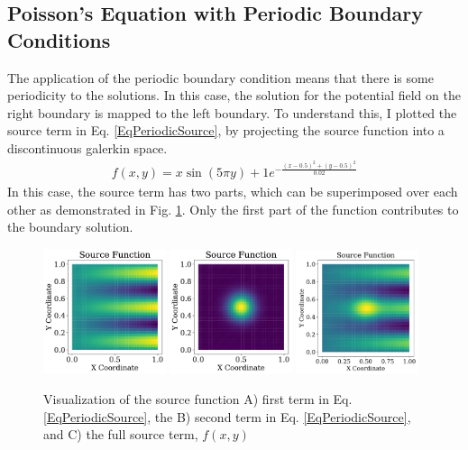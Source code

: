 \documentclass[12pt,3p]{article}
\begin{document}
\subsection{Poisson's Equation with Periodic Boundary Conditions}
\vspace{-1ex}
The application of the periodic boundary condition means that there is some periodicity to the solutions. In this case, the solution for the potential field on the right boundary is mapped to the left boundary. To understand this, I plotted the source term in Eq. \ref{EqPeriodicSource}, by projecting the source function into a discontinuous galerkin space. 
\begin{align}\label{EqPeriodicSource}
f(x,y) = x \sin(5 \pi y) + 1 e^{-\frac{(x-0.5)^2 + (y-0.5)^2}{0.02}}
\end{align}
In this case, the source term has two parts, which can be superimposed over each other as demonstrated in Fig. \ref{FigSource}. Only the first part of the function contributes to the boundary solution. \\ 
\begin{figure}[!htb]
\centering
\includegraphics[width=0.32\textwidth]{./Images/Periodic/PeriodicSource1}
\includegraphics[width=0.32\textwidth]{./Images/Periodic/PeriodicSource2}
\includegraphics[width=0.32\textwidth]{./Images/Periodic/PeriodicSource}
\caption{Visualization of the source function A) first term in Eq. \ref{EqPeriodicSource}, the B) second term in Eq. \ref{EqPeriodicSource}, and C) the full source term, $f(x,y)$}
\label{FigSource}
\end{figure}
\end{document}
